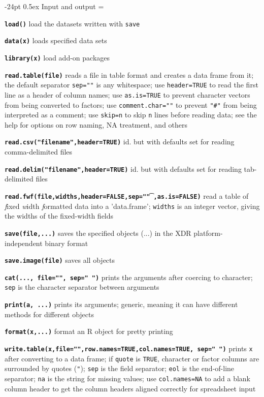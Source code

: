 \documentclass[10pt,landscape]{article}
\makeatletter
\renewcommand\section{\@startsection{section}{1}{0mm}%
                                     {-24pt}%
                                     {0.5ex}%
                                {\color{blue}\normalfont\large\bfseries}}
\newcommand{\code}{\texttt}
\newcommand{\bcode}[1]{\texttt{\textbf{#1}}}
\makeatother
\begin{document}
\begin{multicols}{3}
\section{Input and output}
\everypar={\hangindent=9mm}

\bcode{load()} load the datasets written with \code{save}

\bcode{data(x)} loads specified data sets

\bcode{library(x)} load add-on packages

\bcode{read.table(file)} reads a file in table format and
                creates a data frame from it; the default separator
                \code{sep=""} is any whitespace; use \code{header=TRUE}
                to read the first line as a header of column names; use \code{as.is=TRUE} to
                prevent character vectors from being converted to
                factors; use \code{comment.char=""} to prevent
                \code{"\#"} from being interpreted as a comment; use
                \code{skip=n} to skip \code{n} lines before reading data; see
                the help for options on row naming, NA treatment, and
                others

\bcode{read.csv("filename",header=TRUE)} id. but with defaults set for reading
comma-delimited files

\bcode{read.delim("filename",header=TRUE)} id. but with defaults set for reading
tab-delimited files

\bcode{read.fwf(file,widths,header=FALSE,sep="\t",as.is=FALSE)} read a table of \emph{f}ixed \emph{w}idth \emph{f}ormatted data into a
     'data.frame'; \code{widths} is an integer vector, giving the widths of the fixed-width fields

\bcode{save(file,...)} saves the specified objects (...) in the XDR
platform-independent binary format

\bcode{save.image(file)} saves all objects

\bcode{cat(..., file="", sep=" ")} prints the arguments after coercing to
character; \code{sep} is the character separator between arguments

\bcode{print(a, ...)} prints its arguments; generic, meaning it can
have different methods for different objects

\bcode{format(x,...)} format an R object for pretty printing

\bcode{write.table(x,file="",row.names=TRUE,col.names=TRUE, sep=" ")} 
prints \code{x} after converting to a data frame; if \code{quote} is
                 \code{TRUE}, character or factor columns are
                 surrounded by quotes (\code{"}); \code{sep} is the field
                 separator; \code{eol} is the end-of-line separator;
                 \code{na} is the string for missing values; use
                 \code{col.names=NA} to add a blank column header to
                 get the column headers aligned correctly for
                 spreadsheet input


\end{multicols}
\end{document}
